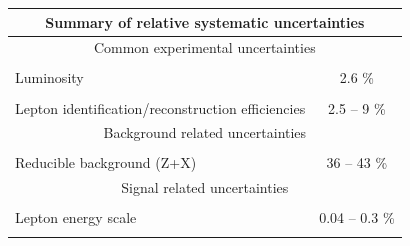 \begin{table}[!htb]
\begin{center}
\small
\begin{tabular}{|lc|} 
\hline %
\hline %
\multicolumn{2}{|c|}{\textbf{Summary of relative systematic uncertainties}} \\
\hline %
\hline %
\multicolumn{2}{|c|}{Common experimental uncertainties} \\
\hline %
\vspace{-0.4cm} & \\
Luminosity & 2.6 \%  \\ 
\vspace{-0.4cm} & \\
Lepton identification/reconstruction efficiencies & 2.5 -- 9 \% \\ 
\hline %
\hline %
\multicolumn{2}{|c|}{Background related uncertainties} \\
\hline %
\vspace{-0.4cm} & \\
Reducible background (Z+X) & 36 -- 43 \% \\ 
\hline %
\hline %
\multicolumn{2}{|c|}{Signal related uncertainties} \\
\hline %
\vspace{-0.4cm} & \\
Lepton energy scale & 0.04 -- 0.3 \% \\ 
\vspace{-0.4cm} & \\

\end{tabular}
\end{center}
\end{table}
